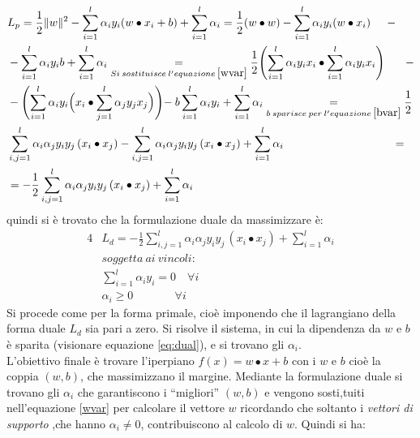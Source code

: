 \begin{equation}
\begin{split}
&L_{p} = \frac{1}{2}\lVert w\rVert^{2} - \sum_{i=1}^{l}\alpha_{i}y_{i}(w \bullet x_{i} + b) + \sum_{i=1}^{l}\alpha_{i} = \frac{1}{2}(w \bullet w) - \sum_{i=1}^{l}\alpha_{i}y_{i}(w \bullet x_{i} ) \quad\:\: -\\
 &- \sum_{i=1}^{l}\alpha_{i}y_{i}b + \sum_{i=1}^{l}\alpha_{i}
\underset{Si \:sostituisce \:l'equazione \:\eqref{wvar}}{=} \frac{1}{2} \Biggl(\sum_{i=1}^{l}\alpha_{i}y_{i}x_{i} \bullet \sum_{i=1}^{l}\alpha_{i}y_{i}x_{i} \Biggl) \quad\:\:\:\, - \\&
- \Biggl(\sum_{i=1}^{l}\alpha_{i}y_{i}\Bigl(x_{i} \bullet \sum_{j=1}^{l}\alpha_{j}y_{j}x_{j}\Bigl)\Biggl) -\:b\sum_{i=1}^{l}\alpha_{i}y_{i} + \sum_{i=1}^{l}\alpha_{i}
\underset{b \:sparisce\:per \:l'equazione\:\eqref{bvar}}{=} \frac{1}{2} \\&\sum_{i,j = 1}^{l}\alpha_{i}\alpha_{j}y_{i}y_{j}\,(x_{i} \bullet x_{j}) - 
 \sum_{i,j = 1}^{l}\alpha_{i}\alpha_{j}y_{i}y_{j}\,(x_{i} \bullet x_{j}) + \sum_{i=1}^{l}\alpha_{i} \qquad \qquad \qquad \qquad \quad\:\:\,=\\
 &= - \frac{1}{2} \sum_{i,j = 1}^{l}\alpha_{i}\alpha_{j}y_{i}y_{j}\,(x_{i} \bullet x_{j}) + \sum_{i=1}^{l}\alpha_{i}
\end{split}
\end{equation}
quindi si è trovato che la formulazione duale da massimizzare è:
\begin{alignat}{4}
& L_{d} = - \frac{1}{2} \sum_{i,j = 1}^{l}\alpha_{i}\alpha_{j}y_{i}y_{j}\,(x_{i} \bullet x_{j}) + \sum_{i=1}^{l}\alpha_{i} \label{eq:dual}\\
& soggetta \:ai\:vincoli: \nonumber\\
&\sum_{i=1}^{l}\alpha_{i}y_{i} = 0 \quad \forall i \\
&\alpha_{i} \geq 0 \qquad \quad\:\:\: \forall i
\end{alignat}
Si procede come per la forma primale,  cioè imponendo che il lagrangiano della forma duale $L_{d}$ sia pari a zero. Si risolve il sistema, in cui la dipendenza da $w$ e $b$ è sparita (visionare equazione \eqref{eq:dual}), e si trovano gli $\alpha_{i}$.\\
 L'obiettivo finale è trovare l'iperpiano $f(x) = w \bullet x +b$ con i $w \text{ e } b$ cioè la coppia $(w,b)$, che massimizzano il margine. Mediante la formulazione duale si trovano gli $\alpha_i$ che garantiscono i ``migliori'' $(w,b)$ e vengono sosti,tuiti nell'equazione \eqref{wvar} per calcolare il vettore $w$ ricordando che soltanto i \textit{vettori di supporto} ,che hanno $\alpha_{i} \neq 0$, contribuiscono al calcolo di $w$. Quindi si ha: 
